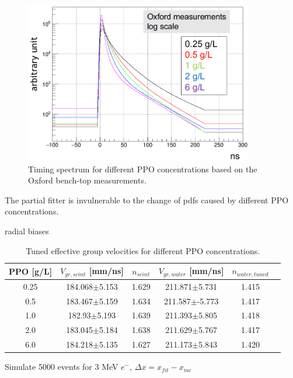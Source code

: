 \begin{figure}[!htb]
	\centering
	\includegraphics[width=10cm]{oxfordPdf_log.png}
	\caption{Timing spectrum for different PPO concentrations based on the Oxford bench-top measurements.}
	\label{oxfordPdf}
\end{figure}
The partial fitter is invulnerable to the change of pdfs caused by different PPO concentrations.

radial biases
\begin{table}[ht]
	\centering
	\caption{\label{partial_groupV}Tuned effective group velocities for different PPO concentrations.}	
	{\centering
		\begin{tabular*}{140mm}{c@{\extracolsep{\fill}}ccccc}
			\toprule 
			PPO [g/L] & $V_{gr,scint}$ [mm/ns]& $n_{scint}$ & $V_{gr,water}$ [mm/ns]& $n_{water,tuned}$\\
			\midrule
			0.25 & 184.068$\pm$5.153 & 1.629 & 211.871$\pm$5.731 & 1.415\\
			0.5  & 183.467$\pm$5.159 &1.634& 211.587$\pm$-5.773 & 1.417 \\
			1.0 & 182.93$\pm$5.193 &1.639& 211.393$\pm$5.805& 1.418 \\
			2.0 & 183.045$\pm$5.184& 1.638& 211.629$\pm$5.767 & 1.417	\\
			6.0 & 184.218$\pm$5.135& 1.627& 211.173$\pm$5.843 &1.420\\
			\bottomrule	
		\end{tabular*}
	}
\end{table}


Simulate 5000 events for 3 MeV $e^-$,  $\Delta x = x_{fit}-x_{mc}$

